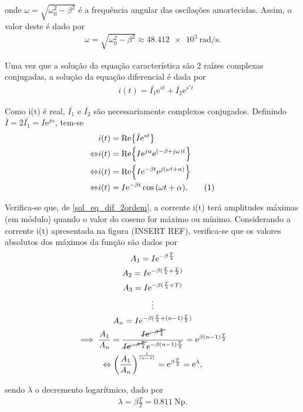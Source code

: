 \documentclass[a4paper, titlepage, portuguese]{article}
\newcommand{\eq}{\Leftrightarrow} %
\newcommand\numberthis{\addtocounter{equation}{1}\tag{\theequation}}
\newcommand\e{\mathrm{e} }
\begin{document}
		onde $\omega = \sqrt{\omega_{0}^{2} - \beta^{2}}$ é a frequência angular das oscilações amortecidas. Assim, o valor deste é dado por
		\begin{align*}
			\omega = \sqrt{\omega_{0}^{2} - \beta^{2}} \approx \SI{48.412e3}{\radian\per\second}.
		\end{align*}
		
		Uma vez que a solução da equação característica são 2 raízes complexas conjugadas, a solução da equação diferencial é dada por
		\begin{align*}
			&i(t) = \bar{I_1}\e^{st} + \bar{I_2}\e^{s^{*}t} 
		\end{align*}
		
		Como i(t) é real, $\bar{I_{1}}$ e $\bar{I_{2}}$ são necessariamente complexos conjugados. Definindo $\bar{I} = 2\bar{I_1} = I\e^{j\alpha}$, tem-se
		\begin{align*}
			& i(t) = \Re{\bar{I}\e^{st}} \\ \eq
			& i(t) = \Re{I\e^{j\alpha}\e^{(-\beta + j\omega)t}} \\ \eq
			& i(t) = \Re{I\e^{-\beta t}\e^{j(\omega t + \alpha)}} \\ \eq
			& i(t) = I\e^{-\beta t} \cos{(\omega t + \alpha)}. \numberthis \label{sol_eq_dif_2ordem}
		\end{align*}
		
		Verifica-se que, de \ref{sol_eq_dif_2ordem}, a corrente i(t) terá amplitudes máximas (em módulo) quando o valor do coseno for máximo ou mínimo. Considerando a corrente i(t) apresentada na figura (INSERT REF), verifica-se que os valores absolutos dos máximos da função são dados por
		\begin{gather*}
			 A_1 = I\e^{-\beta \frac{T}{4}} \\ 
			 A_2 = I\e^{-\beta(\frac{T}{4} + \frac{T}{2})} \\ 
			 A_3 = I\e^{-\beta(\frac{T}{4} + T)}\\ 
			\vdots \\
			 A_n = I\e^{-\beta(\frac{T}{4} + (n-1)\frac{T}{2})} \\
			 \implies \frac{A_1}{A_n} = \frac{\cancel{I\e^{-\beta \frac{T}{4}}}}{\cancel{I\e^{-\beta\frac{T}{4}}} \e^{-\beta(n-1)\frac{T}{2}}} = \e^{\beta(n-1)\frac{T}{2}} \\ \eq
			 \left(\frac{A_1}{A_n}\right)^{\frac{1}{(n-1)}} = \e^{\beta\frac{T}{2}} = \e^\lambda,
		\end{gather*}
		
		sendo $\lambda$ o decremento logarítmico, dado por 
		\begin{align*}
			 \lambda = \beta \frac{T}{2} = \SI{0.811}{\neper}.
		\end{align*}
		
\end{document}
